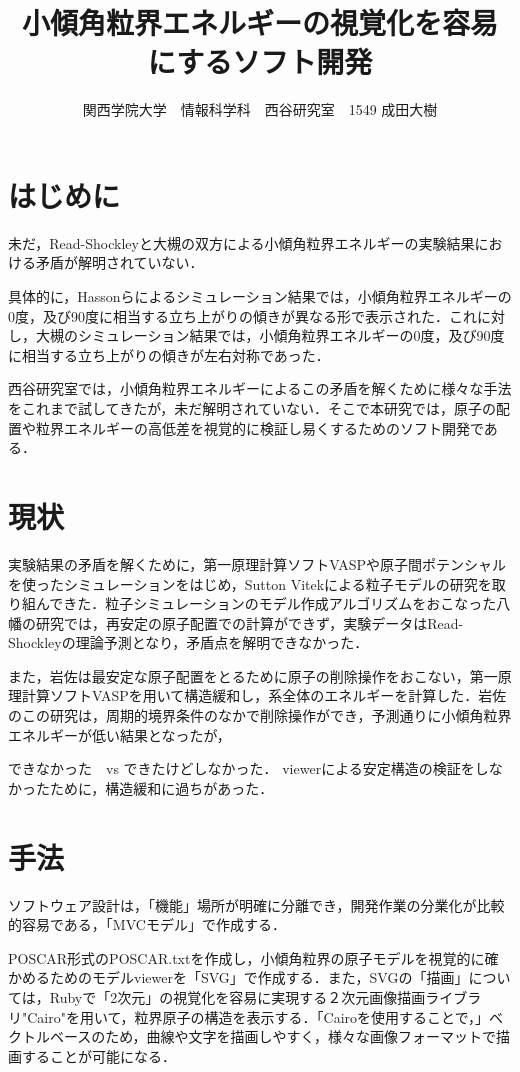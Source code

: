 \documentclass[a4j,twocolumn]{jsarticle}
\begin{document}
\title{小傾角粒界エネルギーの視覚化を容易にするソフト開発}
\author{関西学院大学　情報科学科　西谷研究室　1549 成田大樹}
\date{}
\maketitle

\section{はじめに}
未だ，Read-Shockleyと大槻の双方による小傾角粒界エネルギーの実験結果における矛盾が解明されていない．

具体的に，Hassonらによるシミュレーション結果では，小傾角粒界エネルギーの0度，及び90度に相当する立ち上がりの傾きが異なる形で表示された．これに対し，大槻のシミュレーション結果では，小傾角粒界エネルギーの0度，及び90度に相当する立ち上がりの傾きが左右対称であった\cite{yahata}．

西谷研究室では，小傾角粒界エネルギーによるこの矛盾を解くために様々な手法をこれまで試してきたが，未だ解明されていない．そこで本研究では，原子の配置や粒界エネルギーの高低差を視覚的に検証し易くするためのソフト開発である．

\section{現状}
実験結果の矛盾を解くために，第一原理計算ソフトVASPや原子間ポテンシャルを使ったシミュレーションをはじめ，Sutton Vitekによる粒子モデルの研究を取り組んできた．粒子シミュレーションのモデル作成アルゴリズムをおこなった八幡の研究では，再安定の原子配置での計算ができず，実験データはRead-Shockleyの理論予測となり，矛盾点を解明できなかった．

また，岩佐は最安定な原子配置をとるために原子の削除操作をおこない，第一原理計算ソフトVASPを用いて構造緩和し，系全体のエネルギーを計算した．岩佐のこの研究は，周期的境界条件のなかで削除操作ができ，予測通りに小傾角粒界エネルギーが低い結果となったが，

できなかった　vs できたけどしなかった．
viewerによる安定構造の検証をしなかったために，構造緩和に過ちがあった．

\section{手法}
ソフトウェア設計は，「機能」場所が明確に分離でき，開発作業の分業化が比較的容易である，「MVCモデル」で作成する．

POSCAR形式のPOSCAR.txtを作成し，小傾角粒界の原子モデルを視覚的に確かめるためのモデルviewerを「SVG」で作成する．また，SVGの「描画」については，Rubyで「2次元」の視覚化を容易に実現する２次元画像描画ライブラリ"Cairo"を用いて，粒界原子の構造を表示する．「Cairoを使用することで，」ベクトルベースのため，曲線や文字を描画しやすく，様々な画像フォーマットで描画することが可能になる．
\end{document}
